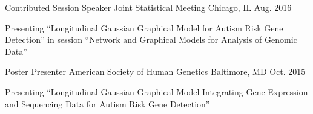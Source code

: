 

\begin{cventries}

  \cventry
    {Contributed Session Speaker} %
    {Joint Statistical Meeting} %
    {Chicago, IL} %
    {Aug. 2016} %
    {
      \begin{cvitems} %
        \item {Presenting ``Longitudinal Gaussian Graphical Model for Autism Risk Gene Detection'' in session ``Network and Graphical Models for Analysis of Genomic Data''}
      \end{cvitems}
    }

  \cventry
    {Poster Presenter} %
    {American Society of Human Genetics} %
    {Baltimore, MD} %
    {Oct. 2015} %
    {
      \begin{cvitems} %
        \item {Presenting ``Longitudinal Gaussian Graphical Model Integrating Gene Expression and Sequencing Data for Autism
        Risk Gene Detection''}
      \end{cvitems}
    }

\end{cventries}
